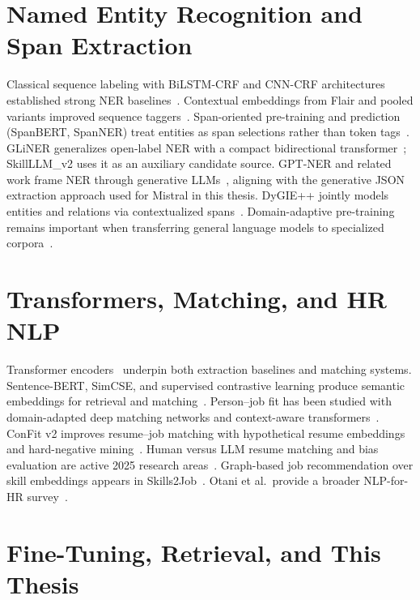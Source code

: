 \documentclass[12pt,oneside]{report}
\begin{document}
\section{Named Entity Recognition and Span Extraction}

Classical sequence labeling with BiLSTM-CRF and CNN-CRF architectures established strong NER baselines~\cite{lample2016ner,ma2016bilstmcnncrf,huang2015bilstmcrf}.
Contextual embeddings from Flair and pooled variants improved sequence taggers~\cite{akbik2018flair,akbik2019pooled}.
Span-oriented pre-training and prediction (SpanBERT, SpanNER) treat entities as span selections rather than token tags~\cite{joshi2020spanbert,fu2021spanner}.
GLiNER generalizes open-label NER with a compact bidirectional transformer~\cite{zaratiana2023gliner}; SkillLLM\_v2 uses it as an auxiliary candidate source.
GPT-NER and related work frame NER through generative LLMs~\cite{wang2023gptner}, aligning with the generative JSON extraction approach used for Mistral in this thesis.
DyGIE++ jointly models entities and relations via contextualized spans~\cite{wadden2019dygiepp}.
Domain-adaptive pre-training remains important when transferring general language models to specialized corpora~\cite{gururangan2020dontstop,gnehm2022transfer}.

\section{Transformers, Matching, and HR NLP}

Transformer encoders~\cite{vaswani2017attention,devlin2019bert,liu2019roberta,conneau2020xlmr} underpin both extraction baselines and matching systems.
Sentence-BERT, SimCSE, and supervised contrastive learning produce semantic embeddings for retrieval and matching~\cite{reimers2019sentencebert,gao2021simcse,khosla2020supervisedcontrastive}.
Person--job fit has been studied with domain-adapted deep matching networks and context-aware transformers~\cite{bian2019domain,li2020competence}.
ConFit v2 improves resume--job matching with hypothetical resume embeddings and hard-negative mining~\cite{yu2025confitv2}.
Human versus LLM resume matching and bias evaluation are active 2025 research areas~\cite{vaishampayan2025humanllm,iso2025bias}.
Graph-based job recommendation over skill embeddings appears in Skills2Job~\cite{giabelli2021skills2job}.
Otani et al.\ provide a broader NLP-for-HR survey~\cite{otani2025hrsurvey}.

\section{Fine-Tuning, Retrieval, and This Thesis}
\end{document}
